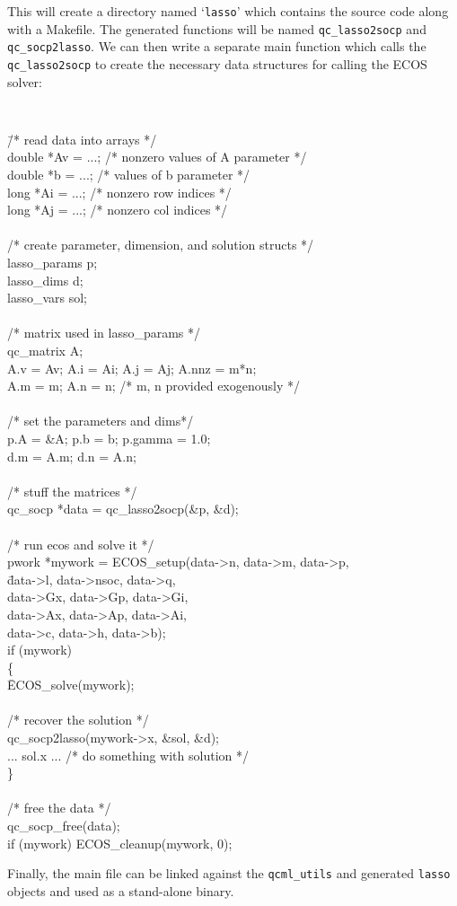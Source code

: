 \documentclass[11pt]{article}
\begin{document}
This will create a directory named `{\tt lasso}' which contains the source code 
along with a Makefile. The
generated functions will be named {\tt qc\_lasso2socp} and {\tt qc\_socp2lasso}.
We can then write a separate main function which calls the {\tt qc\_lasso2socp}
to create the necessary data structures for calling the ECOS solver:
{\tt
\begin{tabbing}
\qquad \= /* read data into arrays */ \\
\> double *Av = ...; /* nonzero values of A parameter */\\
\> double *b = ...;  /* values of b parameter */\\
\> long *Ai = ...;   /* nonzero row indices */\\
\> long *Aj = ...;   /* nonzero col indices */\\
\\
\> /* create parameter, dimension, and solution structs */\\
\> lasso\_params p;\\
\> lasso\_dims d;\\
\> lasso\_vars sol;\\
\\
\> /* matrix used in lasso\_params */\\
\> qc\_matrix A;\\
\> A.v = Av; A.i = Ai; A.j = Aj; A.nnz = m*n;\\
\> A.m = m; A.n = n; /* m, n provided exogenously */ \\
\\
\> /* set the parameters and dims*/\\
\> p.A = \&A; p.b = b; p.gamma = 1.0;\\
\> d.m = A.m; d.n = A.n;\\
\\
\> /* stuff the matrices */\\
\> qc\_socp *data = qc\_lasso2socp(\&p, \&d);\\
\\
\> /* run ecos and solve it */\\
\> pwork *mywork = ECOS\_setup(data->n, data->m, data->p,\\
\> \quad \= data->l, data->nsoc, data->q,\\
\> \> data->Gx, data->Gp, data->Gi,\\
\> \> data->Ax, data->Ap, data->Ai,\\
\> \> data->c, data->h, data->b);\\
\> if (mywork)\\
\> \{\\
\> \quad \= ECOS\_solve(mywork);\\
\\
\> \> /* recover the solution */ \\
\> \> qc\_socp2lasso(mywork->x, \&sol, \&d);\\
\> \> ... sol.x ... /* do something with solution */\\
\> \}\\
\\
\> /* free the data */ \\
\> qc\_socp\_free(data);\\
\> if (mywork) ECOS\_cleanup(mywork, 0);
\end{tabbing}  
}

Finally, the main file can be linked against the {\tt qcml\_utils} and
generated {\tt lasso} objects and used as a stand-alone binary.




\end{document}
